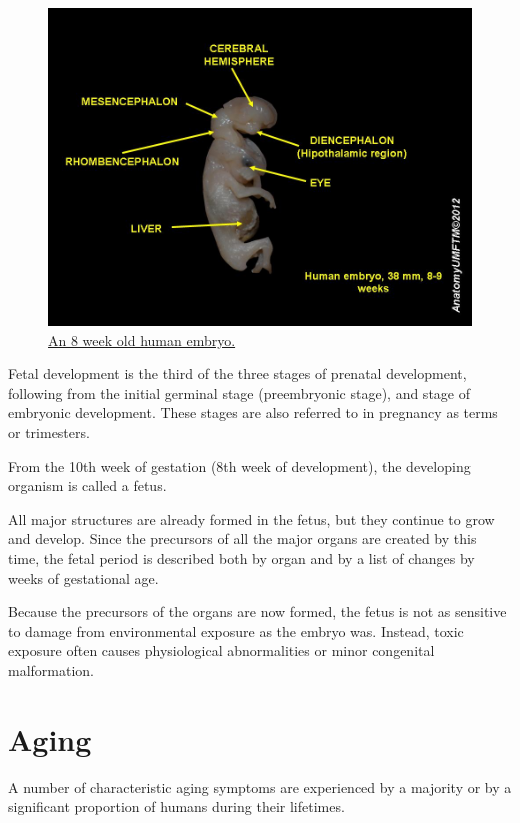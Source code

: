 \begin{figure}

{\centering \includegraphics[width=0.7\linewidth]{./figures/development/Human_embryo_8_weeks_4} 

}

\caption{\href{https://commons.wikimedia.org/wiki/File:Human_embryo_8_weeks_4.JPG}{An 8 week old human embryo.}}\label{fig:humanembryo}
\end{figure}

Fetal development is the third of the three stages of prenatal development, following from the initial germinal stage (preembryonic stage), and stage of embryonic development. These stages are also referred to in pregnancy as terms or trimesters.

From the 10th week of gestation (8th week of development), the developing organism is called a fetus.

All major structures are already formed in the fetus, but they continue to grow and develop. Since the precursors of all the major organs are created by this time, the fetal period is described both by organ and by a list of changes by weeks of gestational age.

Because the precursors of the organs are now formed, the fetus is not as sensitive to damage from environmental exposure as the embryo was. Instead, toxic exposure often causes physiological abnormalities or minor congenital malformation.

\hypertarget{aging}{%
\section{Aging}\label{aging}}

A number of characteristic aging symptoms are experienced by a majority or by a significant proportion of humans during their lifetimes.

